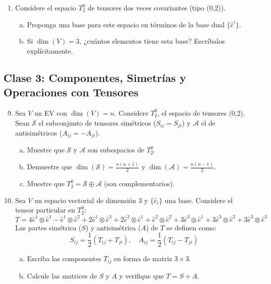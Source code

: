 \documentclass[12pt,a4paper]{article}
\begin{document}
\begin{enumerate}[1.]
\item Considere el espacio $T_2^0$ de tensores dos veces covariantes (tipo (0,2)).
\begin{enumerate}[a)]
\item Proponga una base para este espacio en términos de la base dual $\{\hat{e}^i\}$.
\item Si $\dim(V)=3$, ¿cuántos elementos tiene esta base? Escríbalos explícitamente.
\end{enumerate}
\end{enumerate}

\subsection*{Clase 3: Componentes, Simetrías y Operaciones con Tensores}

\begin{enumerate}[1.]
\setcounter{enumi}{8}
\item Sea $V$ un EV con $\dim(V)=n$. Considere $T_2^0$, el espacio de tensores (0,2). Sean $\mathcal{S}$ el subconjunto de tensores simétricos ($S_{ij}=S_{ji}$) y $\mathcal{A}$ el de antisimétricos ($A_{ij}=-A_{ji}$).
\begin{enumerate}[a)]
\item Muestre que $\mathcal{S}$ y $\mathcal{A}$ son subespacios de $T_2^0$.
\item Demuestre que $\dim(\mathcal{S})=\frac{n(n+1)}{2}$ y $\dim(\mathcal{A})=\frac{n(n-1)}{2}$.
\item Muestre que $T_2^0 = \mathcal{S} \oplus \mathcal{A}$ (son complementarios).
\end{enumerate}

\item Sea $V$ un espacio vectorial de dimensión 3 y $\{\hat{e}_i\}$ una base. Considere el tensor particular en $T_2^0$:
\[
T = 4\hat{e}^1 \otimes \hat{e}^1 - \hat{e}^1 \otimes \hat{e}^2 + 2\hat{e}^1 \otimes \hat{e}^3 + 2\hat{e}^2 \otimes \hat{e}^1 + \hat{e}^2 \otimes \hat{e}^2 + 3\hat{e}^3 \otimes \hat{e}^1 + 3\hat{e}^3 \otimes \hat{e}^2 + 3\hat{e}^3 \otimes \hat{e}^3
\]
Las partes simétrica ($S$) y antisimétrica ($A$) de $T$ se definen como:
\[
S_{ij} = \frac{1}{2}(T_{ij}+T_{ji}), \quad A_{ij} = \frac{1}{2}(T_{ij}-T_{ji})
\]
\begin{enumerate}[a)]
\item Escriba las componentes $T_{ij}$ en forma de matriz $3\times3$.
\item Calcule las matrices de $S$ y $A$ y verifique que $T = S + A$.
\end{enumerate}


\end{enumerate}
\end{document}
